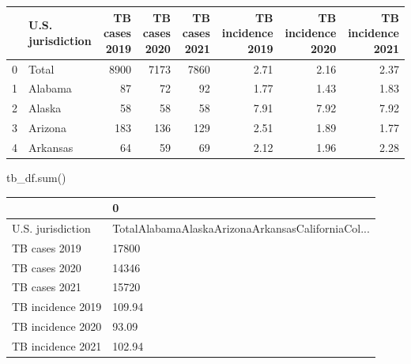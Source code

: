 \documentclass[
  letterpaper,
  DIV=11,
  numbers=noendperiod]{scrreprt}
\newenvironment{Shaded}{\begin{snugshade}}{\end{snugshade}}
\newcommand{\BuiltInTok}[1]{\textcolor[rgb]{0.00,0.23,0.31}{#1}}
\newcommand{\NormalTok}[1]{\textcolor[rgb]{0.00,0.23,0.31}{#1}}
\begin{document}
\begin{tabular}{llrrrrrr}
\toprule
{} & U.S. jurisdiction &  TB cases 2019 &  TB cases 2020 &  TB cases 2021 &  TB incidence 2019 &  TB incidence 2020 &  TB incidence 2021 \\
\midrule
0 &             Total &           8900 &           7173 &           7860 &               2.71 &               2.16 &               2.37 \\
1 &           Alabama &             87 &             72 &             92 &               1.77 &               1.43 &               1.83 \\
2 &            Alaska &             58 &             58 &             58 &               7.91 &               7.92 &               7.92 \\
3 &           Arizona &            183 &            136 &            129 &               2.51 &               1.89 &               1.77 \\
4 &          Arkansas &             64 &             59 &             69 &               2.12 &               1.96 &               2.28 \\
\bottomrule
\end{tabular}

\begin{Shaded}
\begin{Highlighting}[]
\NormalTok{tb\_df.}\BuiltInTok{sum}\NormalTok{()}
\end{Highlighting}
\end{Shaded}

\begin{tabular}{ll}
\toprule
{} &                                                  0 \\
\midrule
U.S. jurisdiction &  TotalAlabamaAlaskaArizonaArkansasCaliforniaCol... \\
TB cases 2019     &                                              17800 \\
TB cases 2020     &                                              14346 \\
TB cases 2021     &                                              15720 \\
TB incidence 2019 &                                             109.94 \\
TB incidence 2020 &                                              93.09 \\
TB incidence 2021 &                                             102.94 \\
\bottomrule
\end{tabular}
\end{document}
